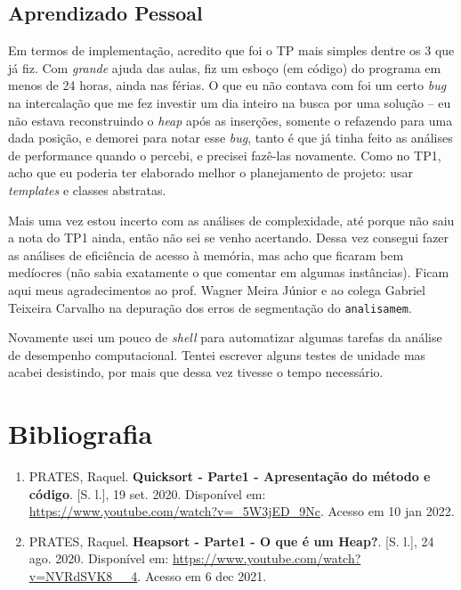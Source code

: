 \documentclass{article}
\def\code#1{\texttt{#1}}
\begin{document}
\subsection{Aprendizado Pessoal}

Em termos de implementação, acredito que foi o TP mais simples dentre os 3 que já fiz. Com \textit{grande} ajuda das aulas, fiz um esboço (em código) do programa em menos de 24 horas, ainda nas férias. O que eu não contava com foi um certo \textit{bug} na intercalação que me fez investir um dia inteiro na busca por uma solução -- eu não estava reconstruindo o \textit{heap} após as inserções, somente o refazendo para uma dada posição, e demorei para notar esse \textit{bug}, tanto é que já tinha feito as análises de performance quando o percebi, e precisei fazê-las novamente. Como no TP1, acho que eu poderia ter elaborado melhor o planejamento de projeto: usar \textit{templates} e classes abstratas.

Mais uma vez estou incerto com as análises de complexidade, até porque não saiu a nota do TP1 ainda, então não sei se venho acertando. Dessa vez consegui fazer as análises de eficiência de acesso à memória, mas acho que ficaram bem medíocres (não sabia exatamente o que comentar em algumas instâncias). Ficam aqui meus agradecimentos ao prof. Wagner Meira Júnior e ao colega Gabriel Teixeira Carvalho na depuração dos erros de segmentação do \code{analisamem}.

Novamente usei um pouco de \textit{shell} para automatizar algumas tarefas da análise de desempenho computacional. Tentei escrever alguns testes de unidade mas acabei desistindo, por mais que dessa vez tivesse o tempo necessário.

\section{Bibliografia}

\begin{enumerate}

	\item PRATES, Raquel. \textbf{Quicksort - Parte1 - Apresentação do método e código}. [S. l.], 19 set. 2020. Disponível em: \url{https://www.youtube.com/watch?v=_5W3jED_9Nc}. Acesso em 10 jan 2022.

	\item PRATES, Raquel. \textbf{Heapsort - Parte1 - O que é um Heap?}. [S. l.], 24 ago. 2020. Disponível em: \url{https://www.youtube.com/watch?v=NVRdSVK8__4}. Acesso em 6 dec 2021.

\end{enumerate}
\end{document}
